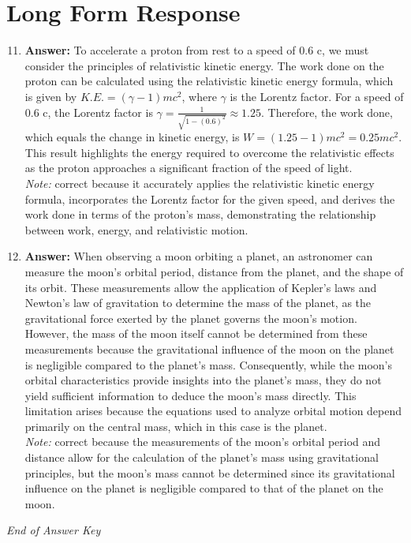 \documentclass[12pt]{article}
\begin{document}
\section*{Long Form Response}
\begin{enumerate}[label=\arabic*.]
\setcounter{enumi}{10}
\item \textbf{Answer:} To accelerate a proton from rest to a speed of 0.6 c, we must consider the principles of relativistic kinetic energy. The work done on the proton can be calculated using the relativistic kinetic energy formula, which is given by \( K.E. = (\gamma - 1)mc^2 \), where \( \gamma \) is the Lorentz factor. For a speed of 0.6 c, the Lorentz factor is \( \gamma = \frac{1}{\sqrt{1 - (0.6)^2}} \approx 1.25 \). Therefore, the work done, which equals the change in kinetic energy, is \( W = (1.25 - 1)mc^2 = 0.25 mc^2 \). This result highlights the energy required to overcome the relativistic effects as the proton approaches a significant fraction of the speed of light.
\\ \textit{Note:} correct because it accurately applies the relativistic kinetic energy formula, incorporates the Lorentz factor for the given speed, and derives the work done in terms of the proton's mass, demonstrating the relationship between work, energy, and relativistic motion.
\item \textbf{Answer:} When observing a moon orbiting a planet, an astronomer can measure the moon's orbital period, distance from the planet, and the shape of its orbit. These measurements allow the application of Kepler's laws and Newton's law of gravitation to determine the mass of the planet, as the gravitational force exerted by the planet governs the moon's motion. However, the mass of the moon itself cannot be determined from these measurements because the gravitational influence of the moon on the planet is negligible compared to the planet's mass. Consequently, while the moon's orbital characteristics provide insights into the planet's mass, they do not yield sufficient information to deduce the moon's mass directly. This limitation arises because the equations used to analyze orbital motion depend primarily on the central mass, which in this case is the planet.
\\ \textit{Note:} correct because the measurements of the moon's orbital period and distance allow for the calculation of the planet's mass using gravitational principles, but the moon's mass cannot be determined since its gravitational influence on the planet is negligible compared to that of the planet on the moon.
\end{enumerate}

\vfill
\noindent\textit{End of Answer Key}
\end{document}
